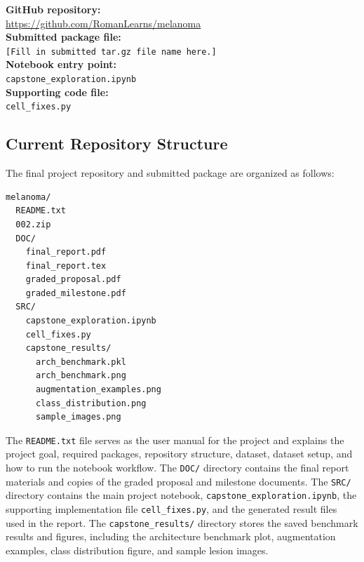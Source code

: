 \documentclass{article}
\begin{document}
\noindent\textbf{GitHub repository:} \\
\url{https://github.com/RomanLearns/melanoma} \\


\noindent\textbf{Submitted package file:} \\
\texttt{[Fill in submitted tar.gz file name here.]} \\

\noindent\textbf{Notebook entry point:} \\
\texttt{capstone\_exploration.ipynb} \\

\noindent\textbf{Supporting code file:} \\
\texttt{cell\_fixes.py} \\

\subsection{Current Repository Structure}

The final project repository and submitted package are organized as follows:

\begin{verbatim}
melanoma/
  README.txt
  002.zip
  DOC/
    final_report.pdf
    final_report.tex
    graded_proposal.pdf
    graded_milestone.pdf
  SRC/
    capstone_exploration.ipynb
    cell_fixes.py
    capstone_results/
      arch_benchmark.pkl
      arch_benchmark.png
      augmentation_examples.png
      class_distribution.png
      sample_images.png
\end{verbatim}

The \texttt{README.txt} file serves as the user manual for the project and explains the project goal,
required packages, repository structure, dataset, dataset setup, and how to run the notebook workflow. The
\texttt{DOC/} directory contains the final report materials and copies of the graded proposal and
milestone documents. The \texttt{SRC/} directory contains the main project notebook,
\texttt{capstone\_exploration.ipynb}, the supporting implementation file \texttt{cell\_fixes.py}, and
the generated result files used in the report. The \texttt{capstone\_results/} directory stores the
saved benchmark results and figures, including the architecture benchmark plot, augmentation
examples, class distribution figure, and sample lesion images.
\end{document}
